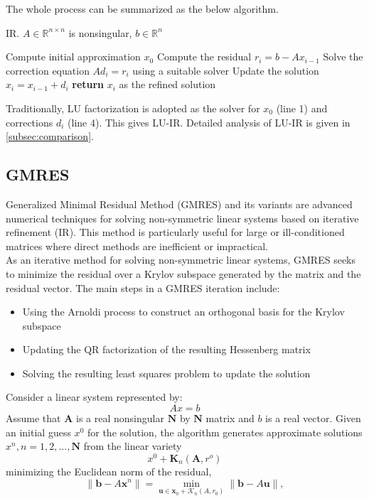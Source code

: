 The whole process can be summarized as the below algorithm.
\begin{algorithm}
\caption{IR. $A \in \mathbb{R}^{n \times n}$ is nonsingular, $b \in \mathbb{R}^n$}
\begin{algorithmic}[1]
    \State Compute initial approximation $x_0$
        \State Compute the residual $r_i = b - Ax_{i-1}$
        \State Solve the correction equation $Ad_i = r_i$ using a suitable solver
        \State Update the solution $x_i = x_{i-1} + d_i$
    \EndFor
    \State \textbf{return} $x_i$ as the refined solution
\end{algorithmic}
\end{algorithm}

Traditionally, LU factorization is adopted as the solver for $x_0$ (line 1) and corrections $d_i$ (line 4). This gives LU-IR. Detailed analysis of LU-IR is given in \ref{subsec:comparison}.


\subsection{GMRES}
Generalized Minimal Residual Method (GMRES) and its variants are advanced numerical techniques for solving non-symmetric linear systems based on iterative refinement (IR). This method is particularly useful for large or ill-conditioned matrices where direct methods are inefficient or impractical. \\
As an iterative method for solving non-symmetric linear systems, GMRES seeks to minimize the residual over a Krylov subspace generated by the matrix and the residual vector. The main steps in a GMRES iteration include\cite{Homer1988}:
\begin{itemize}
    \item Using the Arnoldi process to construct an orthogonal basis for the Krylov subspace
    \item Updating the QR factorization of the resulting Hessenberg matrix
    \item Solving the resulting least squares problem to update the solution
\end{itemize}

Consider a linear system represented by:
\begin{equation}
    Ax=b
\end{equation}
Assume that $\textbf{A}$ is a real nonsingular $\textbf{N}$ by $\textbf{N}$ matrix and $b$ is a real vector. Given an initial guess $x^0$ for the solution, the algorithm generates approximate solutions $x^n,n=1,2,...,\textbf{N}$ from the linear variety
\begin{equation}
    x^0+\textbf{K}_n(\textbf{A},r^o)
\end{equation}
minimizing the Euclidean norm of the residual,
\begin{equation}
    \| \mathbf{b} - A\mathbf{x}^n \| = \min_{\mathbf{u} \in \mathbf{x}_0 + \mathcal{K}_n(A,r_0)} \| \mathbf{b} - A\mathbf{u} \|,
\end{equation}

